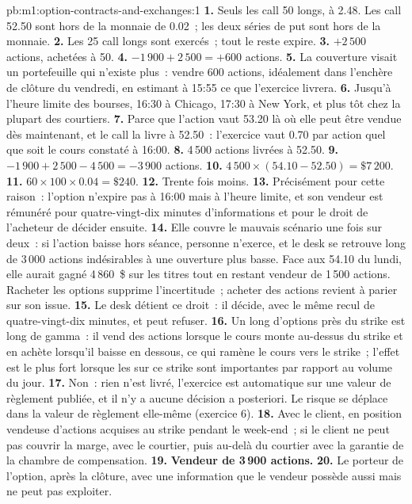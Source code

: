 \begin{solution}{pb:m1:option-contracts-and-exchanges:1}
\textbf{1.} Seuls les call 50 longs, à 2.48. Les call 52.50 sont hors de la
monnaie de 0.02~; les deux séries de put sont hors de la monnaie.
\textbf{2.} Les 25 call longs sont exercés~; tout le reste expire.
\textbf{3.} $+2\,500$ actions, achetées à 50.
\textbf{4.} $-1\,900 + 2\,500 = +600$ actions.
\textbf{5.} La couverture visait un portefeuille qui n'existe plus~: vendre 600 actions,
idéalement dans l'enchère de clôture du vendredi, en estimant à 15:55 ce que l'exercice
livrera.
\textbf{6.} Jusqu'à l'heure limite des bourses, 16:30 à Chicago, 17:30 à New
York, et plus tôt chez la plupart des courtiers.
\textbf{7.} Parce que l'action vaut 53.20 là où elle peut être vendue dès maintenant, et
le call la livre à 52.50~: l'exercice vaut 0.70 par action quel que soit le
cours constaté à 16:00.
\textbf{8.} 4\,500 actions livrées à 52.50.
\textbf{9.} $-1\,900 + 2\,500 - 4\,500 = -3\,900$ actions.
\textbf{10.} $4\,500 \times (54.10 - 52.50) = \$7\,200$.
\textbf{11.} $60 \times 100 \times 0.04 = \$240$.
\textbf{12.} Trente fois moins.
\textbf{13.} Précisément pour cette raison~: l'option n'expire pas à 16:00
mais à l'heure limite, et son vendeur est rémunéré pour quatre-vingt-dix minutes d'informations et pour
le droit de l'acheteur de décider ensuite.
\textbf{14.} Elle couvre le mauvais scénario une fois sur deux~: si l'action
baisse hors séance, personne n'exerce, et le desk se retrouve long de 3\,000 actions indésirables
à une ouverture plus basse. Face aux 54.10 du lundi, elle aurait gagné
4\,860~\$ sur les titres tout en restant vendeur de 1\,500 actions. Racheter les options
supprime l'incertitude~; acheter des actions revient à parier sur son issue.
\textbf{15.} Le desk détient ce droit~: il décide, avec le même recul de quatre-vingt-dix
minutes, et peut refuser.
\textbf{16.} Un  long d'options près du strike est long de gamma~: il
vend des actions lorsque le cours monte au-dessus du strike et en achète lorsqu'il baisse en dessous,
ce qui ramène le cours vers le strike~; l'effet est le plus fort lorsque
les  sur ce strike sont importantes par rapport au volume du jour.
\textbf{17.} Non~: rien n'est livré, l'exercice est automatique sur une
valeur de règlement publiée, et il n'y a aucune décision a posteriori. Le
risque se déplace dans la valeur de règlement elle-même (exercice 6).
\textbf{18.} Avec le client, en position vendeuse d'actions acquises au
strike pendant le week-end~; si le client ne peut pas couvrir la marge, avec le
courtier, puis au-delà du courtier avec la garantie de la chambre de compensation.
\textbf{19.} \textbf{Vendeur de 3\,900 actions.}
\textbf{20.} Le porteur de l'option, après la clôture, avec une information que le
vendeur possède aussi mais ne peut pas exploiter.
\end{solution}

